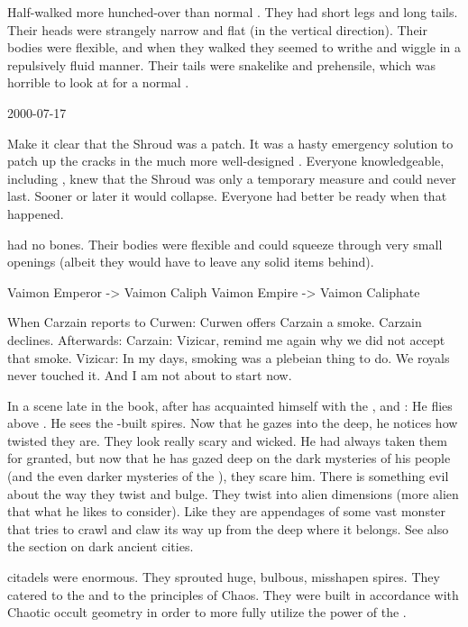Half-\nagae walked more hunched-over than normal \scathae.
They had short legs and long tails. 
Their heads were strangely narrow and flat (in the vertical direction). 
Their bodies were flexible, and when they walked they seemed to writhe and wiggle in a repulsively fluid manner.
Their tails were snakelike and prehensile, which was horrible to look at for a normal \scatha.



2000-07-17 

Make it clear that the Shroud was a patch. 
It was a hasty emergency solution to patch up the cracks in the much more well-designed \CrystalSphere. 
Everyone knowledgeable, including \Ishnaruchaefir, knew that the Shroud was only a temporary measure and could never last. 
Sooner or later it would collapse.
Everyone had better be ready when that happened. 


\Banes had no bones.
Their bodies were flexible and could squeeze through very small openings (albeit they would have to leave any solid items behind). 


Vaimon Emperor -> Vaimon Caliph
Vaimon Empire  -> Vaimon Caliphate


When Carzain reports to Curwen:
  Curwen offers Carzain a smoke.
  Carzain declines.
Afterwards:
  Carzain: Vizicar, remind me again why we did not accept that smoke. 
  Vizicar: In my days, smoking was a plebeian thing to do. We royals never touched it. And I am not about to start now. 


In a scene late in the book, after \Teshrial has acquainted himself with the \noggyaleth, \neoresphain and \WanderersInDarknessEmph:
  He flies above \Nyx.
  He sees the \bane-built spires. 
  Now that he gazes into the deep, he notices how twisted they are.
  They look really scary and wicked.
  He had always taken them for granted, but now that he has gazed deep on the dark mysteries of his people (and the even darker mysteries of the \banes), they scare him.
  There is something evil about the way they twist and bulge.
  They twist into alien dimensions (more alien that what he likes to consider). 
  Like they are appendages of some vast monster that tries to crawl and claw its way up from the deep where it belongs. 
  See also the section on dark ancient cities. 


\Draconian citadels were enormous. 
They sprouted huge, bulbous, misshapen spires.
They catered to the \xss and to the principles of Chaos. 
They were built in accordance with Chaotic occult geometry in order to more fully utilize the power of the \xss. 



